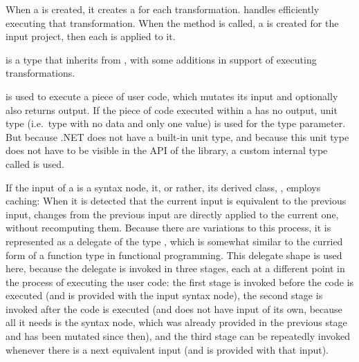\medskip

When a  is created, it creates a  for each transformation.  handles efficiently executing that transformation. When the  method is called, a  is created for the input project, then each  is applied to it.

 is a type that inherits from , with some additions in support of executing transformations.

\medskip

 is used to execute a piece of user code, which mutates its input and optionally also returns output. If the piece of code executed within a  has no output, unit type (i.e.\ type with no data and only one value) is used for the  type parameter. But because .NET does not have a built-in unit type, and because this unit type does not have to be visible in the \ac{API} of the library, a custom internal type called  is used.\footnotemark{}



If the input of a  is a syntax node, it, or rather, its derived class, , employs caching: When it is detected that the current input is equivalent to the previous input, changes from the previous input are directly applied to the current one, without recomputing them. Because there are variations to this process, it is represented as a delegate of the type , which is somewhat similar to the curried form of a function type in functional programming. This delegate shape is used here, because the delegate is invoked in three stages, each at a different point in the process of executing the user code: the first stage is invoked before the code is executed (and is provided with the input syntax node), the second stage is invoked after the code is executed (and does not have input of its own, because all it needs is the syntax node, which was already provided in the previous stage and has been mutated since then), and the third stage can be repeatedly invoked whenever there is a next equivalent input (and is provided with that input).

